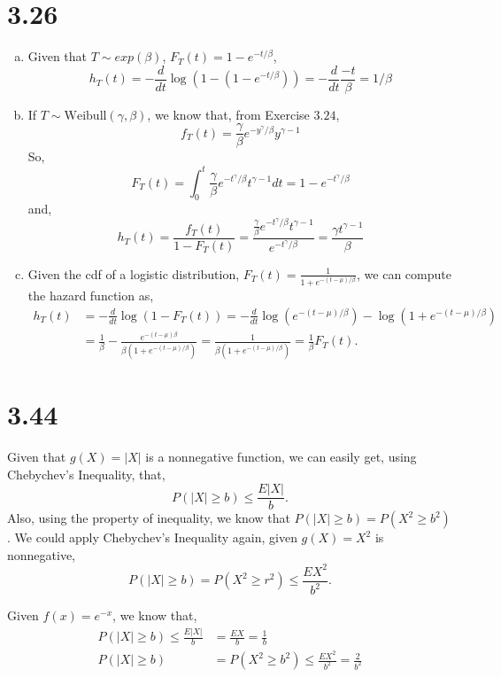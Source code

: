 \documentclass[letterpaper]{article}
\begin{document}
    \section*{3.26}
    \begin{enumerate}[(a)]
    \item Given that $T \sim exp(\beta)$, $F_T(t) = 1 - e^{-t/\beta}$, 
    \[
    h_T(t) = -\frac{d}{dt}\log(1-(1-e^{-t/\beta})) = -\frac{d}{dt}\frac{-t}{\beta} = 1/\beta
    \]
    \item If $T \sim \text{Weibull}(\gamma, \beta)$, we know that, from Exercise $3.24$, 
    \[
    f_T(t) = \frac{\gamma}{\beta} e^{-y^\gamma/\beta} y^{\gamma-1}
    \]
    So,
    \[
    F_T(t) = \int_0^t \frac{\gamma}{\beta} e^{-t^\gamma/\beta} t^{\gamma -1} dt = 1-e^{-t^\gamma/\beta}
    \]
    and,
    \[
    h_T(t) = \frac{f_T(t)}{1-F_T(t)} = \frac{\frac{\gamma}{\beta} e^{-t^\gamma/\beta} t^{\gamma-1}}{e^{-t^\gamma/\beta}} = \frac{\gamma t^{\gamma-1}}{\beta}
    \]
    \item Given the cdf of a logistic distribution, $F_T(t) = \frac{1}{1+e^{-(t-\mu)/\beta}}$, we can compute the hazard function as,
    \begin{align*}
    h_T(t) & = -\frac{d}{dt} \log(1-F_T(t)) = -\frac{d}{dt} \log(e^{-(t-\mu)/\beta}) - \log(1+e^{-(t-\mu)/\beta}) \\
    & = \frac{1}{\beta} - \frac{e^{-(t-\mu)\beta}}{\beta(1+e^{-(t-\mu)/\beta})} = \frac{1}{\beta(1+e^{-(t-\mu)/\beta})} = \frac{1}{\beta} F_T(t).
    \end{align*}
    \end{enumerate}

    \section*{3.44}
    Given that $g(X) = |X|$ is a nonnegative function, we can easily get, using Chebychev's Inequality, that,
    \[
    P(|X| \ge b) \le \frac{E|X|}{b}.
    \]
    Also, using the property of inequality, we know that $P(|X| \ge b) = P(X^2 \ge b^2)$. We could apply Chebychev's Inequality again, given $g(X) = X^2$ is nonnegative,
    \[
    P(|X| \ge b) = P(X^2 \ge r^2) \le \frac{EX^2}{b^2}.
    \]
    
   Given $f(x) = e^{-x}$, we know that,
   \begin{align*}
   P(|X| \ge b) \le \frac{E|X|}{b} & = \frac{EX}{b} = \frac{1}{b} \\
   P(|X| \ge b) & = P(X^2 \ge b^2) \le \frac{EX^2}{b^2} = \frac{2}{b^2}
   \end{align*}
\end{document}
